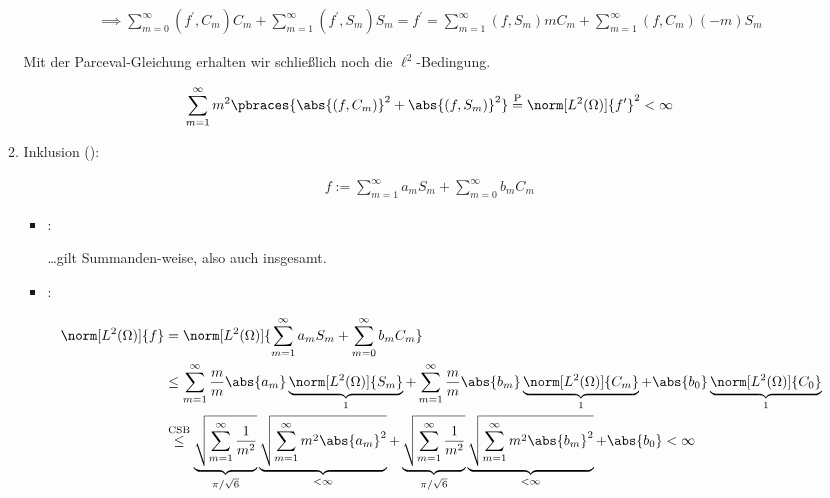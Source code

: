 \begin{solution}
\begin{enumerate}[label = (\roman*)]
\begin{enumerate}
    \begin{align*}
      \implies
      \sum_{m=0}^\infty (f^\prime, C_m) C_m + \sum_{m=1}^\infty (f^\prime, S_m) S_m
      =
      f^\prime
      =
      \sum_{m=1}^\infty (f, S_m) m C_m + \sum_{m=1}^\infty (f, C_m) (-m) S_m
    \end{align*}

    Mit der Parceval-Gleichung erhalten wir schließlich noch die $\ell^2$-Bedingung.

    \begin{align*}
      \sum_{m=1}^\infty m^2 \pbraces{\abs{(f, C_m)}^2 + \abs{(f, S_m)}^2}
      \stackrel
      {
        \mathrm{P}
      }{=}
      \norm[L^2(\Omega)]{f^\prime}^2
      <
      \infty
    \end{align*}

    \item Inklusion (\Quote{$\supseteq$}):

    \begin{align*}
      f
      :=
      \sum_{m=1}^\infty a_m S_m + \sum_{m=0}^\infty b_m C_m
    \end{align*}

    \begin{itemize}

      \item {}:

      \dots gilt Summanden-weise, also auch insgesamt.

      \item {}:

      \begin{align*}
        \norm[L^2(\Omega)]{f}
        & =
        \norm[L^2(\Omega)]
        {
          \sum_{m=1}^\infty a_m S_m + \sum_{m=0}^\infty b_m C_m
        } \\
        & \leq
        \sum_{m=1}^\infty \frac{m}{m} \abs{a_m} \underbrace{\norm[L^2(\Omega)]{S_m}}_1
        +
        \sum_{m=1}^\infty \frac{m}{m} \abs{b_m} \underbrace{\norm[L^2(\Omega)]{C_m}}_1
        +
        \abs{b_0} \underbrace{\norm[L^2(\Omega)]{C_0}}_1 \\
        & \stackrel
        {
          \mathrm{CSB}
        }{\leq}
        \underbrace
        {
          \sqrt
          {
            \sum_{m=1}^\infty \frac{1}{m^2}
          }
        }_{
          \pi / \sqrt{6}
        }
        \underbrace
        {
          \sqrt
          {
            \sum_{m=1}^\infty m^2 \abs{a_m}^2
          }
        }_{
          < \infty
        }
        +
        \underbrace
        {
          \sqrt
          {
            \sum_{m=1}^\infty \frac{1}{m^2}
          }
        }_{
          \pi / \sqrt{6}
        }
        \underbrace
        {
          \sqrt
          {
            \sum_{m=1}^\infty m^2 \abs{b_m}^2
          }
        }_{
          < \infty
        }
        +
        \abs{b_0}        <
        \infty
      \end{align*}


\end{itemize}
\end{enumerate}
\end{enumerate}
\end{solution}

